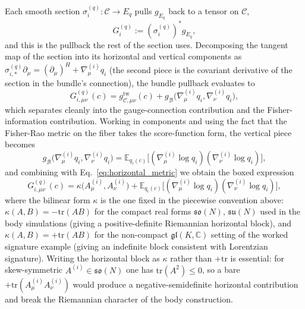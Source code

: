 \documentclass[11pt]{article}
\begin{document}
Each smooth section $\sigma_i^{(q)}: \mathcal{C} \to E_q$ pulls $g_{E_q}$ back to a tensor on $\mathcal{C}$,
\begin{equation}
G_i^{(q)} := (\sigma_i^{(q)})^* g_{E_q},
\end{equation}
and this is the pullback the rest of the section uses. Decomposing the tangent map of the section into its horizontal and vertical components as $\sigma_{i,*}^{(q)}\partial_\mu = (\partial_\mu)^H + \nabla^{(i)}_\mu q_i$ (the second piece is the covariant derivative of the section in the bundle's connection), the bundle pullback evaluates to
\begin{equation}
G^{(q)}_{i,\mu\nu}(c) = g_{\mathcal{C},\mu\nu}^{\mathrm{tw}}(c) + g_{\mathcal{B}}\big(\nabla^{(i)}_\mu q_i, \nabla^{(i)}_\nu q_i\big),
\end{equation}
which separates cleanly into the gauge-connection contribution and the Fisher-information contribution. Working in components and using the fact that the Fisher-Rao metric on the fiber takes the score-function form, the vertical piece becomes
\begin{equation}
g_{\mathcal{B}}\big(\nabla^{(i)}_\mu q_i, \nabla^{(i)}_\nu q_i\big) = \mathbb{E}_{q_i(c)}\big[(\nabla^{(i)}_\mu \log q_i)(\nabla^{(i)}_\nu \log q_i)\big],
\end{equation}
and combining with Eq.~\eqref{eq:horizontal_metric} we obtain the boxed expression
\begin{equation}
\boxed{G^{(q)}_{i,\mu\nu}(c) = \kappa\big(A^{(i)}_\mu, A^{(i)}_\nu\big) + \mathbb{E}_{q_i(c)}\big[(\nabla^{(i)}_\mu \log q_i)(\nabla^{(i)}_\nu \log q_i)\big],}
\label{eq:induced_metric_full}
\end{equation}
where the bilinear form $\kappa$ is the one fixed in the piecewise convention above: $\kappa(A,B) = -\mathrm{tr}(AB)$ for the compact real forms $\mathfrak{so}(N)$, $\mathfrak{su}(N)$ used in the body simulations (giving a positive-definite Riemannian horizontal block), and $\kappa(A,B) = +\mathrm{tr}(AB)$ for the non-compact $\mathfrak{gl}(K, \mathbb{C})$ setting of the worked signature example (giving an indefinite block consistent with Lorentzian signature). Writing the horizontal block as $\kappa$ rather than $+\mathrm{tr}$ is essential: for skew-symmetric $A^{(i)} \in \mathfrak{so}(N)$ one has $\mathrm{tr}(A^2) \le 0$, so a bare $+\mathrm{tr}(A^{(i)}_\mu A^{(i)}_\nu)$ would produce a negative-semidefinite horizontal contribution and break the Riemannian character of the body construction.
\end{document}
